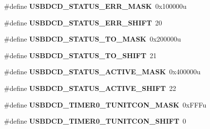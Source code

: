 \begin{DoxyCompactItemize}
\item 
\#define {\bfseries U\+S\+B\+D\+C\+D\+\_\+\+S\+T\+A\+T\+U\+S\+\_\+\+E\+R\+R\+\_\+\+M\+A\+SK}~0x100000u\hypertarget{group__USBDCD__Register__Masks_gaa0a0297c32e8af91d40e8cba8ffe8d1e}{}\label{group__USBDCD__Register__Masks_gaa0a0297c32e8af91d40e8cba8ffe8d1e}

\item 
\#define {\bfseries U\+S\+B\+D\+C\+D\+\_\+\+S\+T\+A\+T\+U\+S\+\_\+\+E\+R\+R\+\_\+\+S\+H\+I\+FT}~20\hypertarget{group__USBDCD__Register__Masks_gac82e47386e1af144b9e4d579bacfca50}{}\label{group__USBDCD__Register__Masks_gac82e47386e1af144b9e4d579bacfca50}

\item 
\#define {\bfseries U\+S\+B\+D\+C\+D\+\_\+\+S\+T\+A\+T\+U\+S\+\_\+\+T\+O\+\_\+\+M\+A\+SK}~0x200000u\hypertarget{group__USBDCD__Register__Masks_ga69616f9e6fd32921dee0543a3cfde633}{}\label{group__USBDCD__Register__Masks_ga69616f9e6fd32921dee0543a3cfde633}

\item 
\#define {\bfseries U\+S\+B\+D\+C\+D\+\_\+\+S\+T\+A\+T\+U\+S\+\_\+\+T\+O\+\_\+\+S\+H\+I\+FT}~21\hypertarget{group__USBDCD__Register__Masks_ga2b59871476643f7c428868c6ebbcef5a}{}\label{group__USBDCD__Register__Masks_ga2b59871476643f7c428868c6ebbcef5a}

\item 
\#define {\bfseries U\+S\+B\+D\+C\+D\+\_\+\+S\+T\+A\+T\+U\+S\+\_\+\+A\+C\+T\+I\+V\+E\+\_\+\+M\+A\+SK}~0x400000u\hypertarget{group__USBDCD__Register__Masks_ga6127ac2a4e36e01dfe2c939203f8a72f}{}\label{group__USBDCD__Register__Masks_ga6127ac2a4e36e01dfe2c939203f8a72f}

\item 
\#define {\bfseries U\+S\+B\+D\+C\+D\+\_\+\+S\+T\+A\+T\+U\+S\+\_\+\+A\+C\+T\+I\+V\+E\+\_\+\+S\+H\+I\+FT}~22\hypertarget{group__USBDCD__Register__Masks_ga77f2a6e381b526f9d70e13cdf21332a5}{}\label{group__USBDCD__Register__Masks_ga77f2a6e381b526f9d70e13cdf21332a5}

\item 
\#define {\bfseries U\+S\+B\+D\+C\+D\+\_\+\+T\+I\+M\+E\+R0\+\_\+\+T\+U\+N\+I\+T\+C\+O\+N\+\_\+\+M\+A\+SK}~0x\+F\+F\+Fu\hypertarget{group__USBDCD__Register__Masks_ga21cf0206b969eecd876b5b612ca33f9e}{}\label{group__USBDCD__Register__Masks_ga21cf0206b969eecd876b5b612ca33f9e}

\item 
\#define {\bfseries U\+S\+B\+D\+C\+D\+\_\+\+T\+I\+M\+E\+R0\+\_\+\+T\+U\+N\+I\+T\+C\+O\+N\+\_\+\+S\+H\+I\+FT}~0\hypertarget{group__USBDCD__Register__Masks_ga4a35e4b1c280e2a888b8505ab2009370}{}\label{group__USBDCD__Register__Masks_ga4a35e4b1c280e2a888b8505ab2009370}


\end{DoxyCompactItemize}
